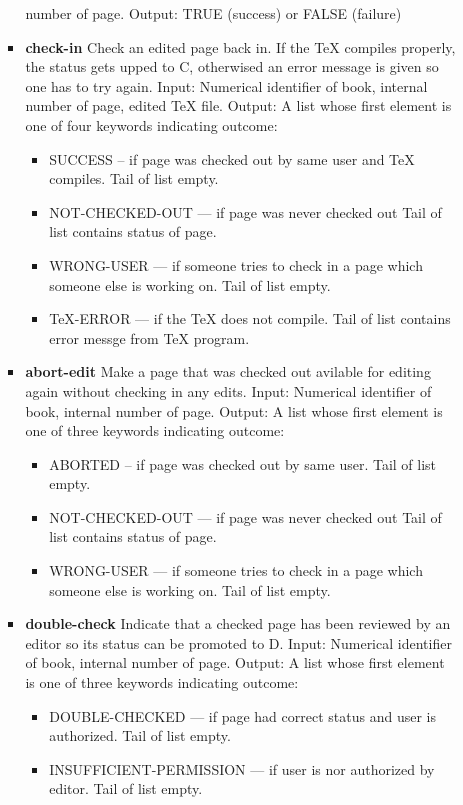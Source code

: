 \begin{itemize}
\begin{itemize}
\begin{itemize}
  number of page.  Output: TRUE (success) or FALSE (failure)
\item
  {\bf check-in}  Check an edited page back in. If the TeX compiles
  properly, the status gets upped to C, otherwised an error message is
  given so one has to try again.  Input: Numerical identifier of book,
  internal number of page, edited TeX file.  Output: A list whose first
  element is one of four keywords indicating outcome:
  \begin{itemize}
  \item SUCCESS
    -- if page was checked out by same user and TeX compiles. Tail of list
    empty. 
  \item NOT-CHECKED-OUT --- if page was never checked out Tail
    of list contains status of page. 
  \item WRONG-USER --- if someone
    tries to check in a page which someone else is working on. Tail of
    list empty. 
  \item TeX-ERROR --- if the TeX does not compile. Tail
    of list contains error messge from TeX program.
  \end{itemize}
\item 
  {\bf abort-edit}  Make a page that was checked out avilable for editing
  again without checking in any edits.  Input: Numerical identifier of
  book, internal number of page.  Output: A list whose first element is
  one of three keywords indicating outcome:
\begin{itemize}
 \item ABORTED -- if page
  was checked out by same user. Tail of list empty. 
\item
  NOT-CHECKED-OUT --- if page was never checked out Tail of list
  contains status of page. 
\item WRONG-USER --- if someone tries to
  check in a page which someone else is working on. Tail of list empty.
\end{itemize}
\item
  {\bf double-check}  Indicate that a checked page has been reviewed by an
  editor so its status can be promoted to D.  Input: Numerical
  identifier of book, internal number of page.  Output: A list whose
  first element is one of three keywords indicating outcome:
  \begin{itemize}
  \item
    DOUBLE-CHECKED --- if page had correct status and user is authorized.
    Tail of list empty. 
  \item INSUFFICIENT-PERMISSION --- if user is
    nor authorized by editor. Tail of list empty. 

\end{itemize}
\end{itemize}
\end{itemize}
\end{itemize}
